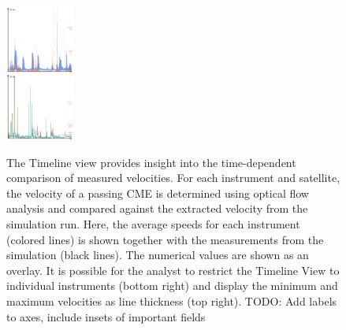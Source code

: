 \documentclass[journal]{vgtc}                %
\newcommand{\abImageHeight}{4.5cm}
\begin{document}
\begin{figure}
{  \includegraphics[height=\abImageHeight]{figures/timelineview_combined.png}
}
\caption{The Timeline view provides insight into the time-dependent comparison of measured velocities. For each instrument and satellite, the velocity of a passing CME is determined using optical flow analysis and compared against the extracted velocity from the simulation run. Here, the average speeds for each instrument (colored lines) is shown together with the measurements from the simulation (black lines). The numerical values are shown as an overlay. It is possible for the analyst to restrict the Timeline View to individual instruments (bottom right) and display the minimum and maximum velocities as line thickness (top right). TODO:  Add labels to axes, include insets of important fields}
\label{fig:timeline}
\end{figure}
\end{document}
